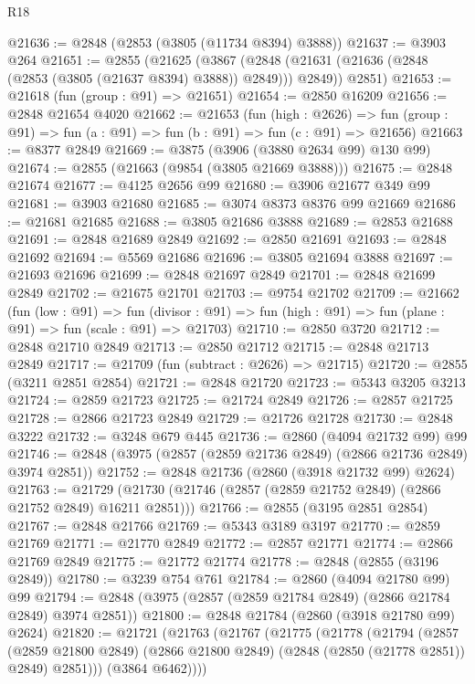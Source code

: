 \begin{lexlean}{R18}
\begin{coremodule}
@21636 := @2848 (@2853 (@3805 (@11734 @8394) @3888))
@21637 := @3903 @264
@21651 := @2855
    (@21625
      (@3867 (@2848 (@21631 (@21636 (@2848 (@2853 (@3805 (@21637 @8394) @3888)) @2849))) @2849))
      @2851)
@21653 := @21618 (fun (group : @91) => @21651)
@21654 := @2850 @16209
@21656 := @2848 @21654 @4020
@21662 := @21653
    (fun (high : @2626) =>
    fun (group : @91) => fun (a : @91) => fun (b : @91) => fun (c : @91) => @21656)
@21663 := @8377 @2849
@21669 := @3875 (@3906 (@3880 @2634 @99) @130 @99)
@21674 := @2855 (@21663 (@9854 (@3805 @21669 @3888)))
@21675 := @2848 @21674
@21677 := @4125 @2656 @99
@21680 := @3906 @21677 @349 @99
@21681 := @3903 @21680
@21685 := @3074 @8373 @8376 @99 @21669
@21686 := @21681 @21685
@21688 := @3805 @21686 @3888
@21689 := @2853 @21688
@21691 := @2848 @21689 @2849
@21692 := @2850 @21691
@21693 := @2848 @21692
@21694 := @5569 @21686
@21696 := @3805 @21694 @3888
@21697 := @21693 @21696
@21699 := @2848 @21697 @2849
@21701 := @2848 @21699 @2849
@21702 := @21675 @21701
@21703 := @9754 @21702
@21709 := @21662
    (fun (low : @91) =>
    fun (divisor : @91) => fun (high : @91) => fun (plane : @91) => fun (scale : @91) => @21703)
@21710 := @2850 @3720
@21712 := @2848 @21710 @2849
@21713 := @2850 @21712
@21715 := @2848 @21713 @2849
@21717 := @21709 (fun (subtract : @2626) => @21715)
@21720 := @2855 (@3211 @2851 @2854)
@21721 := @2848 @21720
@21723 := @5343 @3205 @3213
@21724 := @2859 @21723
@21725 := @21724 @2849
@21726 := @2857 @21725
@21728 := @2866 @21723 @2849
@21729 := @21726 @21728
@21730 := @2848 @3222
@21732 := @3248 @679 @445
@21736 := @2860 (@4094 @21732 @99) @99
@21746 := @2848 (@3975 (@2857 (@2859 @21736 @2849) (@2866 @21736 @2849) @3974 @2851))
@21752 := @2848 @21736 (@2860 (@3918 @21732 @99) @2624)
@21763 := @21729 (@21730 (@21746 (@2857 (@2859 @21752 @2849) (@2866 @21752 @2849) @16211 @2851)))
@21766 := @2855 (@3195 @2851 @2854)
@21767 := @2848 @21766
@21769 := @5343 @3189 @3197
@21770 := @2859 @21769
@21771 := @21770 @2849
@21772 := @2857 @21771
@21774 := @2866 @21769 @2849
@21775 := @21772 @21774
@21778 := @2848 (@2855 (@3196 @2849))
@21780 := @3239 @754 @761
@21784 := @2860 (@4094 @21780 @99) @99
@21794 := @2848 (@3975 (@2857 (@2859 @21784 @2849) (@2866 @21784 @2849) @3974 @2851))
@21800 := @2848 @21784 (@2860 (@3918 @21780 @99) @2624)
@21820 := @21721
    (@21763
      (@21767
        (@21775
          (@21778
            (@21794
              (@2857
                (@2859 @21800 @2849)
                (@2866 @21800 @2849)
                (@2848 (@2850 (@21778 @2851)) @2849)
                @2851)))
          (@3864 @6462))))

\end{coremodule}
\end{lexlean}
